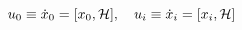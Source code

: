 \begin{equation}\label{8}
 u_0 \equiv  \dot x_0 =  [x_0,{\cal H}], \quad u_i \equiv  \dot x_i =  [x_i,{\cal H}]
\end{equation}

